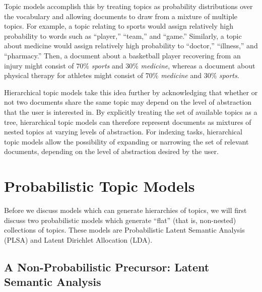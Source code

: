\documentclass{article}
\begin{document}
Topic models accomplish this by treating topics as probability distributions over the vocabulary and allowing documents to draw from a mixture of multiple topics.
For example, a topic relating to sports would assign relatively high probability to words such as ``player,'' ``team,'' and ``game.''
Similarly, a topic about medicine would assign relatively high probability to ``doctor,'' ``illness,'' and ``pharmacy.''
Then, a document about a basketball player recovering from an injury might consist of $70\%$ \emph{sports} and $30\%$ \emph{medicine}, whereas a document about physical therapy for athletes might consist of $70\%$ \emph{medicine} and $30\%$ \emph{sports}.

Hierarchical topic models take this idea further by acknowledging that whether or not two documents share the same topic may depend on the level of abstraction that the user is interested in.
By explicitly treating the set of available topics as a tree, hierarchical topic models can therefore represent documents as mixtures of nested topics at varying levels of abstraction.
For indexing tasks, hierarchical topic models allow the possibility of expanding or narrowing the set of relevant documents, depending on the level of abstraction desired by the user.

\section{Probabilistic Topic Models}

Before we discuss models which can generate hierarchies of topics, we will first discuss two probabilistic models which generate ``flat'' (that is, non-nested) collections of topics.
These models are Probabilistic Latent Semantic Analysis (PLSA) and Latent Dirichlet Allocation (LDA).

\subsection{A Non-Probabilistic Precursor: Latent Semantic Analysis}
\end{document}
